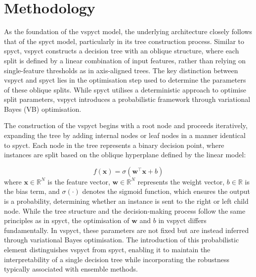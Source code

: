 \documentclass[3p,review,authoryear]{elsarticle}
\begin{document}
\section{Methodology}

As the foundation of the \gls{vspyct} model, the underlying architecture closely follows that of the \gls{spyct} model, particularly in its tree construction process.
Similar to \gls{spyct}, \gls{vspyct} constructs a decision tree with an oblique structure, where each split is defined by a linear combination of input features, rather than relying on single-feature thresholds as in axis-aligned trees.
The key distinction between \gls{vspyct} and \gls{spyct} lies in the optimisation step used to determine the parameters of these oblique splits.
While \gls{spyct} utilises a deterministic approach to optimise split parameters, \gls{vspyct} introduces a probabilistic framework through variational Bayes (VB) optimisation.

The construction of the \gls{vspyct} begins with a root node and proceeds iteratively, expanding the tree by adding internal nodes or leaf nodes in a manner identical to \gls{spyct}. Each node in the tree represents a binary decision point, where instances are split based on the oblique hyperplane defined by the linear model:

\begin{equation}
f(\mathbf{x}) = \sigma \left(\mathbf{w}^\top \mathbf{x} + b \right)
\label{eq:linear_model}
\end{equation}
where \(\mathbf{x} \in \mathbb{R}^N\) is the feature vector, \(\mathbf{w} \in \mathbb{R}^N\) represents the weight vector, \(b \in \mathbb{R}\) is the bias term, and \(\sigma(\cdot)\) denotes the sigmoid function, which ensures the output is a probability, determining whether an instance is sent to the right or left child node.
While the tree structure and the decision-making process follow the same principles as in \gls{spyct}, the optimisation of \(\mathbf{w}\) and \(b\) in \gls{vspyct} differs fundamentally.
In \gls{vspyct}, these parameters are not fixed but are instead inferred through variational Bayes optimisation.
The introduction of this probabilistic element distinguishes \gls{vspyct} from \gls{spyct}, enabling it to maintain the interpretability of a single decision tree while incorporating the robustness typically associated with ensemble methods.

\end{document}
